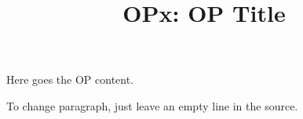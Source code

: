 \documentclass[10pt,a4paper]{article}
\title{\textbf{OPx: OP Title}}
\author{}
\date{}
\begin{document}
\maketitle
\thispagestyle{empty}

Here goes the OP content.

To change paragraph,
just leave an empty line in the source.

\end{document}
